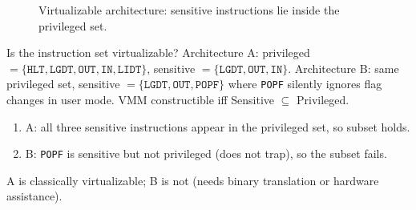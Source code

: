 \begin{figure}[H]
\centering
{}
\caption{Virtualizable architecture: sensitive instructions lie inside the privileged set.}
\end{figure}

\begin{solved}{Is the instruction set virtualizable?}
\Given Architecture A: privileged $=\{\texttt{HLT},\texttt{LGDT},\texttt{OUT},\texttt{IN},\texttt{LIDT}\}$, sensitive $=\{\texttt{LGDT},\texttt{OUT},\texttt{IN}\}$.
Architecture B: same privileged set, sensitive $=\{\texttt{LGDT},\texttt{OUT},\texttt{POPF}\}$ where \texttt{POPF} silently ignores flag changes in user mode.
\Formula VMM constructible iff Sensitive $\subseteq$ Privileged.
\Steps
\begin{enumerate}[leftmargin=*]
  \item A: all three sensitive instructions appear in the privileged set, so subset holds.
  \item B: \texttt{POPF} is sensitive but not privileged (does not trap), so the subset fails.
\end{enumerate}
\Answer A is classically virtualizable; B is not (needs binary translation or hardware assistance).
\end{solved}

